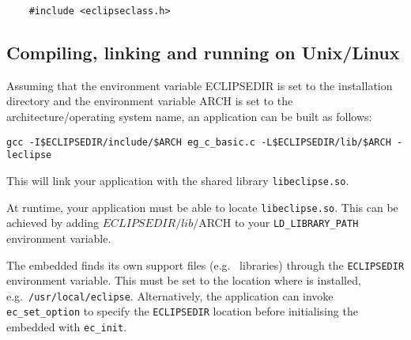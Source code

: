 \begin{verbatim}
    #include <eclipseclass.h>
\end{verbatim}



\subsection{Compiling, linking and running on Unix/Linux}

Assuming that the environment variable ECLIPSEDIR is set to the
{\eclipse} installation directory and the environment variable ARCH is set to
the architecture/operating system name,
an application can be built as follows:
\begin{verbatim}
gcc -I$ECLIPSEDIR/include/$ARCH eg_c_basic.c -L$ECLIPSEDIR/lib/$ARCH -leclipse
\end{verbatim}
This will link your application with the shared library \verb+libeclipse.so+.

At runtime, your application must be able to locate \verb+libeclipse.so+.
This can be achieved by adding $ECLIPSEDIR/lib/$ARCH to your
\verb+LD_LIBRARY_PATH+ environment variable.

The embedded {\eclipse} finds its own support files (e.g.\ {\eclipse} libraries)
through the \verb+ECLIPSEDIR+ environment variable.
This must be set to the location where {\eclipse} is installed,
e.g.\ \verb+/usr/local/eclipse+.
Alternatively, the application can invoke \verb+ec_set_option+ to specify
the \verb+ECLIPSEDIR+ location before initialising the embedded {\eclipse}
with \verb+ec_init+.



